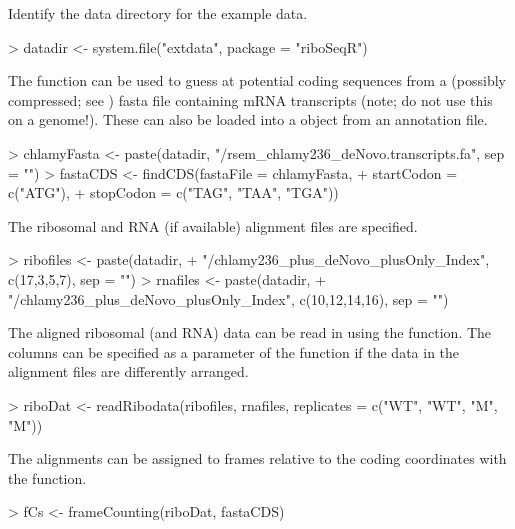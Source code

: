 \documentclass[a4paper]{article}
\begin{document}
Identify the data directory for the example data. 

\begin{Schunk}
\begin{Sinput}
> datadir <- system.file("extdata", package = "riboSeqR")
\end{Sinput}
\end{Schunk}

The  function can be used to guess at potential coding sequences from a (possibly compressed; see ) fasta file containing mRNA transcripts (note; do not use this on a genome!). These can also be loaded into a  object from an annotation file.

\begin{Schunk}
\begin{Sinput}
> chlamyFasta <- paste(datadir, "/rsem_chlamy236_deNovo.transcripts.fa", sep = "")
> fastaCDS <- findCDS(fastaFile = chlamyFasta, 
+                     startCodon = c("ATG"), 
+                     stopCodon = c("TAG", "TAA", "TGA"))
\end{Sinput}
\end{Schunk}

The ribosomal and RNA (if available) alignment files are specified.
\begin{Schunk}
\begin{Sinput}
> ribofiles <- paste(datadir, 
+                    "/chlamy236_plus_deNovo_plusOnly_Index", c(17,3,5,7), sep = "")
> rnafiles <- paste(datadir, 
+                   "/chlamy236_plus_deNovo_plusOnly_Index", c(10,12,14,16), sep = "")
\end{Sinput}
\end{Schunk}

The aligned ribosomal (and RNA) data can be read in using the  function. The columns can be specified as a parameter of the  function if the data in the alignment files are differently arranged.

\begin{Schunk}
\begin{Sinput}
> riboDat <- readRibodata(ribofiles, rnafiles, replicates = c("WT", "WT", "M", "M"))
\end{Sinput}
\end{Schunk}

The alignments can be assigned to frames relative to the coding coordinates with the  function.

\begin{Schunk}
\begin{Sinput}
> fCs <- frameCounting(riboDat, fastaCDS)
\end{Sinput}
\end{Schunk}
\end{document}
